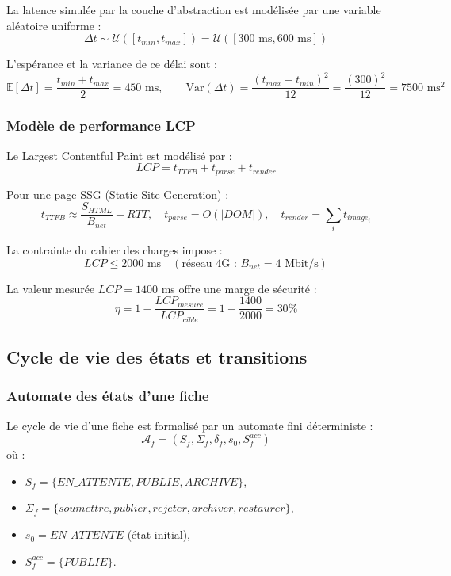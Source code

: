 \documentclass[12pt,a4paper]{report}
\begin{document}
La latence simulée par la couche d'abstraction est modélisée par une variable aléatoire
uniforme :
\[
\Delta t \sim \mathcal{U}([t_{min}, t_{max}]) = \mathcal{U}([300\text{ ms}, 600\text{ ms}])
\]

L'espérance et la variance de ce délai sont :
\[
\mathbb{E}[\Delta t] = \frac{t_{min} + t_{max}}{2} = 450 \text{ ms}, \qquad
\mathrm{Var}(\Delta t) = \frac{(t_{max} - t_{min})^2}{12} = \frac{(300)^2}{12} = 7500 \text{ ms}^2
\]

\subsubsection*{Modèle de performance LCP}

Le Largest Contentful Paint est modélisé par :
\[
LCP = t_{TTFB} + t_{parse} + t_{render}
\]

Pour une page SSG (Static Site Generation) :
\[
t_{TTFB} \approx \frac{S_{HTML}}{B_{net}} + RTT, \quad t_{parse} = O(|DOM|), \quad t_{render} = \sum_{i} t_{image_i}
\]

La contrainte du cahier des charges impose :
\[
LCP \leq 2000 \text{ ms} \quad (\text{réseau 4G : } B_{net} = 4 \text{ Mbit/s})
\]

La valeur mesurée $LCP = 1400$ ms offre une marge de sécurité :
\[
\eta = 1 - \frac{LCP_{mesure}}{LCP_{cible}} = 1 - \frac{1400}{2000} = 30\%
\]

\subsection{Cycle de vie des états et transitions}

\subsubsection*{Automate des états d'une fiche}

Le cycle de vie d'une fiche est formalisé par un automate fini déterministe :
\[
\mathcal{A}_f = (S_f, \Sigma_f, \delta_f, s_0, S_f^{acc})
\]
où :
\begin{itemize}
  \item $S_f = \{EN\_ATTENTE, PUBLIE, ARCHIVE\}$,
  \item $\Sigma_f = \{soumettre, publier, rejeter, archiver, restaurer\}$,
  \item $s_0 = EN\_ATTENTE$ (état initial),
  \item $S_f^{acc} = \{PUBLIE\}$.
\end{itemize}
\end{document}
